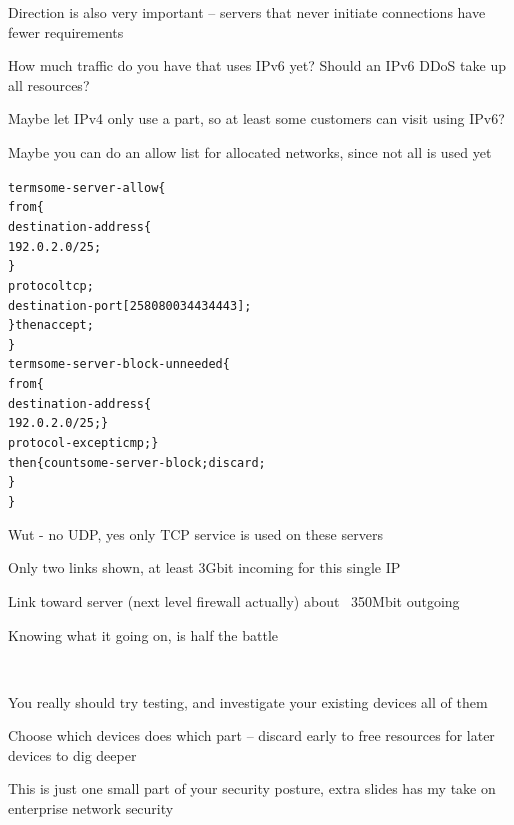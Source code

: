 \documentclass[Screen16to9,17pt]{foils}
\begin{document}
\begin{list2}
\item Direction is also very important -- servers that never initiate connections have fewer requirements
\item How much traffic do you have that uses IPv6 yet? Should an IPv6 DDoS take up all resources?
\item Maybe let IPv4 only use a part, so at least some customers can visit using IPv6?
\item Maybe you can do an allow list for allocated networks, since not all is used yet
\end{list2}



\begin{alltt}\footnotesize
term some-server-allow \{
    from \{
        destination-address \{
            192.0.2.0/25;
        \}
        protocol tcp;
        destination-port [ 25 80 8003 443 4443 ];
    \} then accept;
\}
term some-server-block-unneeded \{
    from \{
        destination-address \{
            192.0.2.0/25; \}
        protocol-except icmp;  \}
    then \{ count some-server-block; discard;
    \}
\}
\end{alltt}

Wut - no UDP, yes only TCP service is used on these servers







\centerline{Only two links shown, at least 3Gbit incoming for this single IP}


\begin{list1}
\item Link toward server (next level firewall actually) about ~350Mbit outgoing
\item Knowing what it going on, is half the battle
\end{list1}



~
\begin{list2}
\item You really should try testing, and investigate your existing devices
all of them
\item Choose which devices does which part -- discard early to free resources for later devices to dig deeper
\item This is just one small part of your security posture, extra slides has my take on enterprise network security
\end{list2}
\end{document}
